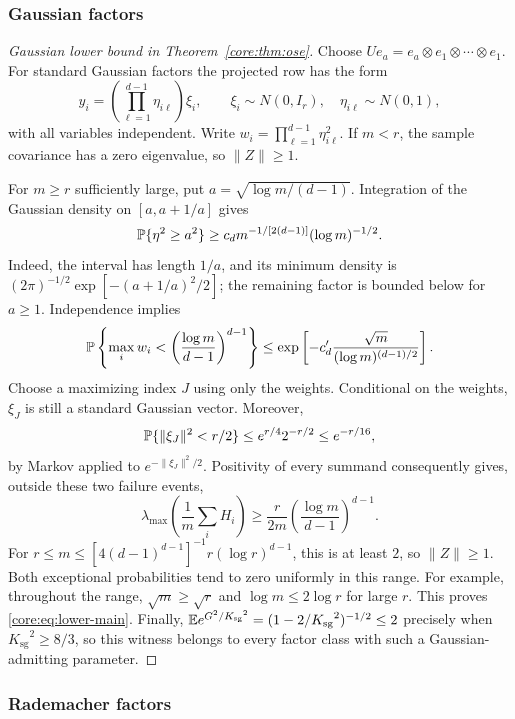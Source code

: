 \documentclass[11pt,a4paper]{article}
\theoremstyle{definition}\newtheorem{definition}[theorem]{Definition}
\theoremstyle{remark}\newtheorem{remark}[theorem]{Remark}
\numberwithin{equation}{section}
\newcommand{\Ksg}{{K_{\mathrm{sg}}}}\newcommand{\Cfour}{{C_4}}
\newcommand{\norm}[1]{\lVert#1\rVert}\newcommand{\ip}[2]{\langle#1,#2\rangle}
\begin{document}
\subsubsection{Gaussian factors}\label{core:sec:lower}
\begin{proof}[Gaussian lower bound in Theorem~\ref{core:thm:ose}]
Choose
$Ue_a=e_a\otimes e_1\otimes\cdots\otimes e_1$. For standard Gaussian
factors the projected row has the form
\[
 y_i=\left(\prod_{\ell=1}^{d-1}\eta_{i\ell}\right)\xi_i,
 \qquad\xi_i\sim N(0,I_r),\quad\eta_{i\ell}\sim N(0,1),
\]
with all variables independent. Write
$w_i=\prod_{\ell=1}^{d-1}\eta_{i\ell}^2$.
If $m<r$, the sample covariance has a zero eigenvalue, so
$\norm Z\ge1$.

For $m\ge r$ sufficiently large, put
$a=\sqrt{\log m/(d-1)}$. Integration of the Gaussian density on
$[a,a+1/a]$ gives
\[
 \mathbb P\{\eta^2\ge a^2\}\ge
 c_d m^{-1/[2(d-1)]}(\log m)^{-1/2}.
\]
Indeed, the interval has length $1/a$, and its minimum density is
$(2\pi)^{-1/2}\exp[-(a+1/a)^2/2]$; the remaining factor is bounded
below for $a\ge1$. Independence implies
\[
 \mathbb P\left\{\max_iw_i<
       \left(\frac{\log m}{d-1}\right)^{d-1}\right\}
 \le\exp\left[-c'_d\frac{\sqrt m}{(\log m)^{(d-1)/2}}\right].
\]
Choose a maximizing index $J$ using only the weights. Conditional on
the weights, $\xi_J$ is still a standard Gaussian vector. Moreover,
\[
 \Pp\{\norm{\xi_J}^2<r/2\}
 \le e^{r/4}2^{-r/2}\le e^{-r/16},
\]
by Markov applied to $e^{-\norm{\xi_J}^2/2}$.
Positivity of every summand consequently gives, outside these two
failure events,
\[
 \lambda_{\max}\left(\frac1m\sum_iH_i\right)
 \ge\frac{r}{2m}\left(\frac{\log m}{d-1}\right)^{d-1}.
\]
For $r\le m\le[4(d-1)^{d-1}]^{-1}r(\log r)^{d-1}$, this is at least
$2$, so $\norm Z\ge1$. Both exceptional probabilities tend to zero
uniformly in this range. For example, throughout the range,
$\sqrt m\ge\sqrt r$ and $\log m\le2\log r$ for large $r$.
This proves \eqref{core:eq:lower-main}.
Finally, $\E e^{G^2/\Ksg^2}=(1-2/\Ksg^2)^{-1/2}\le2$ precisely when
$\Ksg^2\ge8/3$, so this witness belongs to every factor class with such
a Gaussian-admitting parameter.
\end{proof}


\subsubsection{Rademacher factors}
\label{core:sec:rademacher}
\end{document}
